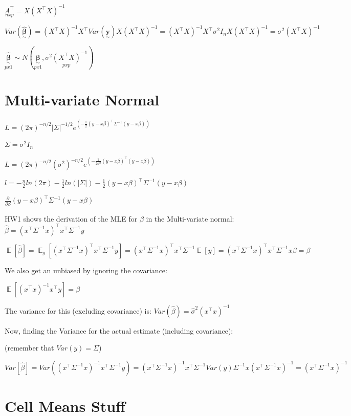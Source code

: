\documentclass{article}
\newcommand{\svec}[1]{\underset{\sim}{\bm{#1}}} %
\DeclareMathOperator{\EX}{\mathbb{E}} %
\begin{document}
$\underset{nxp}{A^{\top}} = X(X^{\top}X)^{-1}$

$Var(\hat{\svec{\beta}}) = (X^{\top}X)^{-1}X^{\top}Var(\svec{y})X(X^{\top}X)^{-1} = (X^{\top}X)^{-1}X^{\top}\sigma^2 I_n X(X^{\top}X)^{-1} = \sigma^2(X^{\top}X)^{-1}$

$\underset{px1}{\hat{\svec{\beta}}} \sim N(\underset{px1}{\svec{\beta}}, \underset{pxp}{\sigma^2(X^{\top}X)^{-1}})$

\section{Multi-variate Normal} 

$L = (2\pi)^{-n/2}|\Sigma|^{-1/2}e^{(-\frac{1}{2}(y-x\beta)^{\top}\Sigma^{-1}(y-x\beta))}$

$\Sigma = \sigma^2 I_n$

$L = (2\pi)^{-n/2}(\sigma^2)^{-n/2}e^{(-\frac{1}{2\sigma^2}(y-x\beta)^{\top}(y-x\beta))}$

$l = -\frac{n}{2}ln(2\pi) - \frac{1}{2}ln(|\Sigma|) - \frac{1}{2}(y-x\beta)^{\top}\Sigma^{-1}(y-x\beta)$

$\frac{\partial}{\partial \beta} (y-x\beta)^{\top}\Sigma^{-1}(y-x\beta)$

HW1 shows the derivation of the MLE for $\beta$ in the Multi-variate normal: $\hat{\beta} = (x^{\top} \Sigma^{-1}x)^{\top}x^{\top}\Sigma^{-1}y$


$\EX[\hat{\beta}] = \EX_y[(x^{\top} \Sigma^{-1}x)^{\top}x^{\top}\Sigma^{-1}y] = (x^{\top} \Sigma^{-1}x)^{\top}x^{\top}\Sigma^{-1}\EX[y] = (x^{\top} \Sigma^{-1}x)^{\top}x^{\top}\Sigma^{-1}x\beta = \beta$

We also get an unbiased by ignoring the covariance: 

$\EX[(x^{\top}x)^{-1}x^{\top}y] = \beta$

The variance for this (excluding covariance) is: $Var(\hat{\beta}) = \hat{\sigma}^2(x^{\top}x)^{-1}$


Now, finding the Variance for the actual estimate (including covariance):

(remember that $Var(y) = \Sigma$)

$Var[\hat{\beta}] = Var((x^{\top}\Sigma^{-1}x)^{-1}x^{\top}\Sigma^{-1}y) = (x^{\top}\Sigma^{-1}x)^{-1} x^{\top}\Sigma^{-1} Var(y) \Sigma^{-1}x(x^{\top}\Sigma^{-1}x)^{-1} = (x^{\top}\Sigma^{-1}x)^{-1}$ 


\section{Cell Means Stuff}
\end{document}
